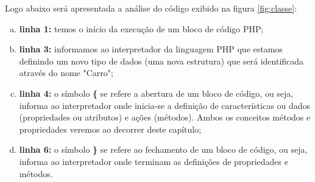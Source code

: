 \FloatBarrier 	%

Logo abaixo será apresentada a análise do código exibido na
figura \ref{fig:classe}:

\begin{enumerate}[a)]
    \item \textbf{linha 1:} temos o início da execução de um bloco de código
    PHP;
    \item \textbf{linha 3:} informamos ao interpretador da linguagem PHP que 
    estamos definindo um novo tipo de dados (uma nova estrutura) que será 
    identificada através do nome "Carro";
    \item \textbf{linha 4:} o símbolo \textbf{\{} se refere a abertura de um
    bloco de código, ou seja, informa ao interpretador onde inicia-se a definição de 
    características ou dados (propriedades ou atributos) e ações (métodos). 
    Ambos os conceitos métodos e propriedades veremos ao decorrer deste
    capítulo;
    \item \textbf{linha 6:} o símbolo \textbf{\}} se refere ao fechamento de um
    bloco de código, ou seja, informa ao interpretador onde terminam as
    definições de propriedades e métodos.
\end{enumerate}